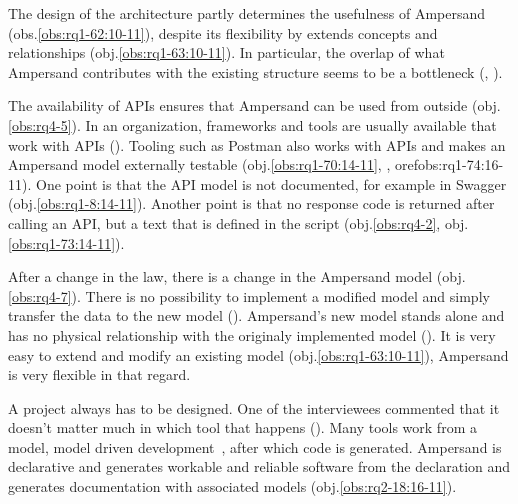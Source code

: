 The design of the architecture partly determines the usefulness of Ampersand (obs.\ref{obs:rq1-62:10-11}), despite its flexibility by extends concepts and relationships (obj.\ref{obs:rq1-63:10-11}).
In particular, the overlap of what Ampersand contributes with the existing structure seems to be a bottleneck (, ).

The availability of APIs ensures that Ampersand can be used from outside (obj.\ref{obs:rq4-5}).
In an organization, frameworks and tools are usually available that work with APIs ().
Tooling such as Postman also works with APIs and makes an Ampersand model externally testable (obj.\ref{obs:rq1-70:14-11}, , oref{obs:rq1-74:16-11}).
One point is that the API model is not documented, for example in Swagger (obj.\ref{obs:rq1-8:14-11}).
Another point is that no response code is returned after calling an API, but a text that is defined in the script (obj.\ref{obs:rq4-2}, obj.\ref{obs:rq1-73:14-11}).

After a change in the law, there is a change in the Ampersand model (obj.\ref{obs:rq4-7}).
There is no possibility to implement a modified model and simply transfer the data to the new model ().
Ampersand's new model stands alone and has no physical relationship with the originaly implemented model ().
It is very easy to extend and modify an existing model (obj.\ref{obs:rq1-63:10-11}), Ampersand is very flexible in that regard.

A project always has to be designed.
One of the interviewees commented that it doesn't matter much in which tool that happens ().
Many tools work from a model, model driven development~\citep{kulkarni_abstraction_2008}, after which code is generated.
Ampersand is declarative and generates workable and reliable software from the declaration and generates documentation with associated models (obj.\ref{obs:rq2-18:16-11}).


